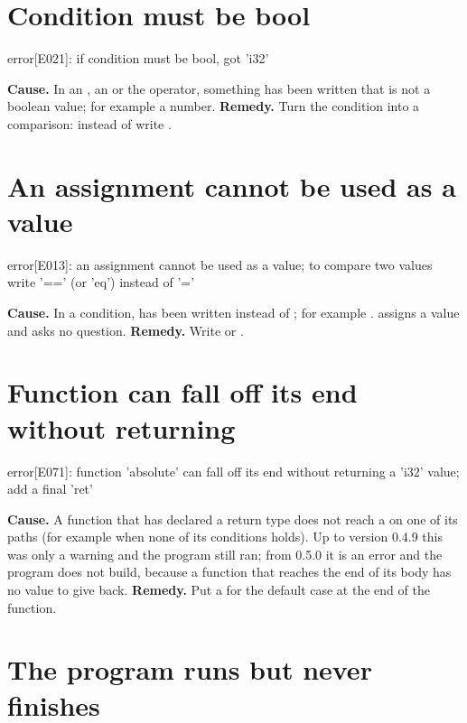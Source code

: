 \section*{Condition must be bool}

\begin{plainout}
error[E021]: if condition must be bool, got 'i32'
\end{plainout}

\textbf{Cause.} In an , an  or the 
operator, something has been written that is not a boolean value; for
example a number.
\textbf{Remedy.} Turn the condition into a comparison: instead of
 write .

\section*{An assignment cannot be used as a value}

\begin{plainout}
error[E013]: an assignment cannot be used as a value;
to compare two values write '==' (or 'eq') instead of '='
\end{plainout}

\textbf{Cause.} In a condition, \code{=} has been written instead of
\code{==}; for example . \code{=} assigns a value and
asks no question.
\textbf{Remedy.} Write  or .

\section*{Function can fall off its end without returning}

\begin{plainout}
error[E071]: function 'absolute' can fall off its end without returning
a 'i32' value; add a final 'ret'
\end{plainout}

\textbf{Cause.} A function that has declared a return type does not reach a
 on one of its paths (for example when none of its conditions
holds). Up to version 0.4.9 this was only a warning and the program still
ran; from 0.5.0 it is an error and the program does not build, because a
function that reaches the end of its body has no value to give back.
\textbf{Remedy.} Put a  for the default case at the end of the
function.

\section*{The program runs but never finishes}

